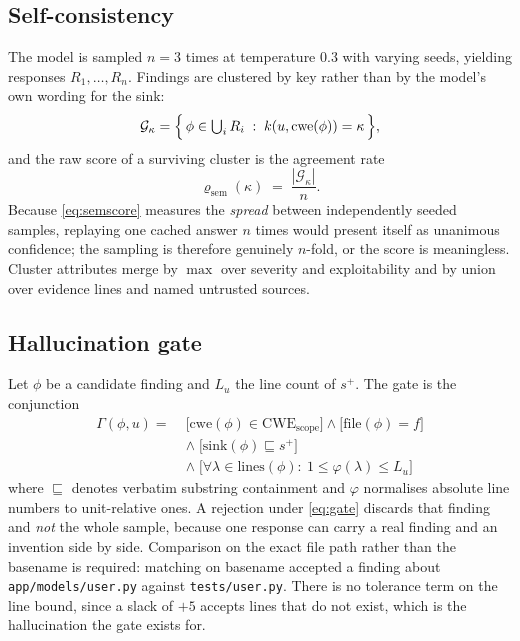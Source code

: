 \documentclass[conference]{IEEEtran}
\newcommand{\Unit}{u}
\begin{document}
\subsection{Self-consistency}
The model is sampled $n=3$ times at temperature $0.3$ with varying seeds, yielding responses
$R_1,\dots,R_n$. Findings are clustered by key rather than by the model's own wording for the
sink:
\begin{equation}
\mathcal{G}_\kappa = \Bigl\{\, \phi \in \textstyle\bigcup_{i} R_i \;:\; k(\Unit, \mathrm{cwe}(\phi)) = \kappa \,\Bigr\},
\end{equation}
and the raw score of a surviving cluster is the agreement rate
\begin{equation}
\varrho_{\mathrm{sem}}(\kappa) \;=\; \frac{|\mathcal{G}_\kappa|}{n}.
\label{eq:semscore}
\end{equation}
Because \eqref{eq:semscore} measures the \emph{spread} between independently seeded samples,
replaying one cached answer $n$ times would present itself as unanimous confidence; the
sampling is therefore genuinely $n$-fold, or the score is meaningless. Cluster attributes
merge by $\max$ over severity and exploitability and by union over evidence lines and named
untrusted sources.

\subsection{Hallucination gate}
Let $\phi$ be a candidate finding and $L_u$ the line count of $s^{+}$. The gate is the
conjunction
\begin{align}
\Gamma(\phi,\Unit) =\;& \bigl[\mathrm{cwe}(\phi) \in \mathrm{CWE}_{\mathrm{scope}}\bigr] \wedge \bigl[\mathrm{file}(\phi)=f\bigr] \nonumber\\
&\wedge\; \bigl[\mathrm{sink}(\phi) \sqsubseteq s^{+}\bigr] \nonumber\\
&\wedge\; \bigl[\forall \lambda \in \mathrm{lines}(\phi):\ 1 \le \varphi(\lambda) \le L_u\bigr]
\label{eq:gate}
\end{align}
where $\sqsubseteq$ denotes verbatim substring containment and $\varphi$ normalises absolute
line numbers to unit-relative ones. A rejection under \eqref{eq:gate} discards that finding
and \emph{not} the whole sample, because one response can carry a real finding and an
invention side by side. Comparison on the exact file path rather than the basename is
required: matching on basename accepted a finding about \texttt{app/models/user.py} against
\texttt{tests/user.py}. There is no tolerance term on the line bound, since a slack of $+5$
accepts lines that do not exist, which is the hallucination the gate exists for.
\end{document}
